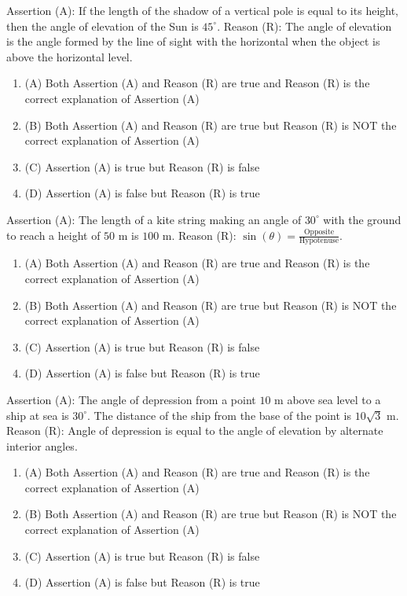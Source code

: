 \documentclass[12pt,a4paper]{exam}
\begin{document}
\begin{questions}
\question[1] Assertion (A): If the length of the shadow of a vertical pole is equal to its height, then the angle of elevation of the Sun is $45^\circ$. Reason (R): The angle of elevation is the angle formed by the line of sight with the horizontal when the object is above the horizontal level.
\begin{enumerate}[label=(\Alph*)]
  \item (A) Both Assertion (A) and Reason (R) are true and Reason (R) is the correct explanation of Assertion (A)
  \item (B) Both Assertion (A) and Reason (R) are true but Reason (R) is NOT the correct explanation of Assertion (A)
  \item (C) Assertion (A) is true but Reason (R) is false
  \item (D) Assertion (A) is false but Reason (R) is true
\end{enumerate}
\vspace{0.15cm}

\question[1] Assertion (A): The length of a kite string making an angle of $30^\circ$ with the ground to reach a height of $50 \text{ m}$ is $100 \text{ m}$. Reason (R): $\sin(\theta) = \frac{\text{Opposite}}{\text{Hypotenuse}}$.
\begin{enumerate}[label=(\Alph*)]
  \item (A) Both Assertion (A) and Reason (R) are true and Reason (R) is the correct explanation of Assertion (A)
  \item (B) Both Assertion (A) and Reason (R) are true but Reason (R) is NOT the correct explanation of Assertion (A)
  \item (C) Assertion (A) is true but Reason (R) is false
  \item (D) Assertion (A) is false but Reason (R) is true
\end{enumerate}
\vspace{0.15cm}

\question[1] Assertion (A): The angle of depression from a point $10 \text{ m}$ above sea level to a ship at sea is $30^\circ$. The distance of the ship from the base of the point is $10\sqrt{3} \text{ m}$. Reason (R): Angle of depression is equal to the angle of elevation by alternate interior angles.
\begin{enumerate}[label=(\Alph*)]
  \item (A) Both Assertion (A) and Reason (R) are true and Reason (R) is the correct explanation of Assertion (A)
  \item (B) Both Assertion (A) and Reason (R) are true but Reason (R) is NOT the correct explanation of Assertion (A)
  \item (C) Assertion (A) is true but Reason (R) is false
  \item (D) Assertion (A) is false but Reason (R) is true
\end{enumerate}
\vspace{0.15cm}


\end{questions}
\end{document}
